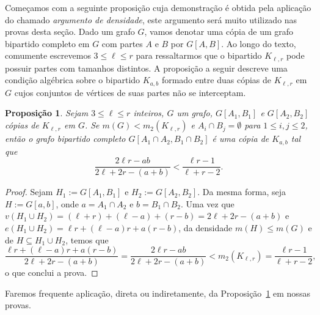 \documentclass[12pt,a4paper]{book}
\newcommand{\K}{K_{\ell,r}} %
\let\subset\subseteq
\newtheorem{proposicao} [teorema] {Proposição}
\begin{document}
     Começamos com a seguinte proposição cuja demonstração é obtida
     pela aplicação do chamado \textit{argumento de densidade}, este argumento será muito utilizado nas provas desta seção.
    Dado um grafo $G$, vamos denotar uma cópia de um grafo bipartido completo em $G$ com partes $A$ e $B$ por $G[A,B]$.
    Ao longo do texto, comumente escrevemos $3\leq \ell \leq r$ para ressaltarmos que o bipartido $\K$ pode possuir partes com tamanhos distintos. 
    A proposição a seguir descreve uma condição algébrica sobre o bipartido $K_{a,b}$ formado entre duas cópias de $\K$ em $G$ cujos conjuntos de vértices de suas partes não se interceptam.

    \begin{proposicao}
        \label{lemma:inter_a} 
    Sejam $3\leq \ell \leq r$ inteiros, $G$ um grafo, $G[A_1,B_1]$ e $G[A_2,B_2]$ cópias de $K_{\ell,r}$ em $G$. 
    Se $m(G) < m_2(\K)$ e
    $A_i \cap B_j = \emptyset$ 
    para $1\leq i,j\leq 2$, então o grafo bipartido completo
    $G[A_1\cap A_2, B_1\cap B_2]$ é uma cópia de $K_{a,b}$ tal que
      \begin{equation}
         \label{eq:pairs-ab} 
    	 \frac{2\ell r - ab}{2\ell + 2r - (a+b)} <
    \frac{\ell r - 1}{\ell + r - 2}.
      \end{equation}
      \end{proposicao}
    \begin{proof}
    Sejam $H_1:=G[A_1,B_1]$ e ${H_2:=G[A_2,B_2]}$.
    Da mesma forma, seja $H := G[a,b]$, onde $a = A_1\cap
    A_2$ e $b = B_1\cap B_2$.  
    Uma vez que 
    $v(H_1 \cup H_2) = (\ell + r) +
    (\ell-a) + (r - b) = 2\ell + 2r - (a+b)$ 
    e $e(H_1 \cup H_2) = \ell r + (\ell-a)r + a(r-b)$, 
    da densidade $m(H) \leq m(G)$ e de $H\subset H_1\cup
    H_2$, temos que
      \begin{equation*} 
      \frac{\ell r + (\ell-a)r + a(r-b)}{2\ell + 2r -
    (a+b)} = \frac{2\ell r - ab}{2\ell + 2r - (a+b)} < m_2(\K) = \frac{\ell r -
    1}{\ell + r - 2},
      \end{equation*}
      o que conclui a prova.
    \end{proof}
    
    Faremos frequente aplicação, direta ou indiretamente, da Proposição~\ref{lemma:inter_a} em nossas provas.
     
\end{document}

